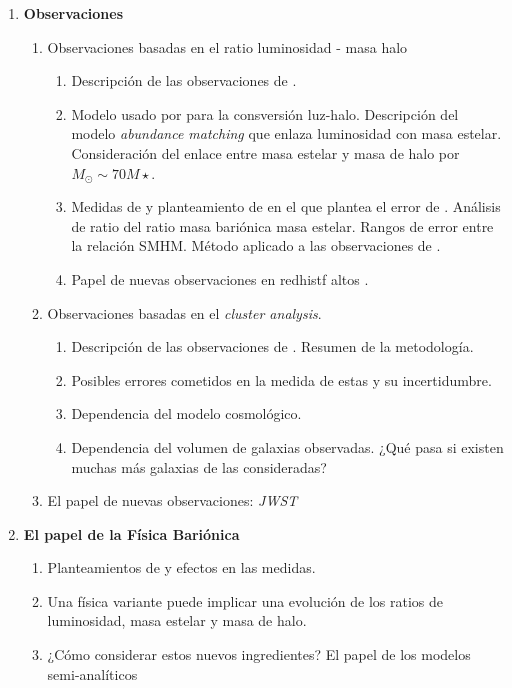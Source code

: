 \begin{enumerate}
	\item \textbf{Observaciones}
	\begin{enumerate}[{3.}1]
		\item Observaciones basadas en el ratio luminosidad - masa halo
		\begin{enumerate}[{3.1.}1]
			\item Descripción de las observaciones de \cite{bouwens2015uv}.
			\item Modelo usado por \cite{steinhardt2016impossibly} para la consversión luz-halo. Descripción del modelo \textit{abundance matching} que enlaza luminosidad con masa estelar. Consideración del enlace entre masa estelar y masa de halo por $M_\odot\sim 70 M\star$.
			\item Medidas de \citep{behroozi2019universemachine} y planteamiento de \cite{behroozi2018mostmassive} en el que plantea el error de \cite{steinhardt2016impossibly}. Análisis de ratio del ratio masa bariónica masa estelar. Rangos de error entre la relación SMHM. Método aplicado a las observaciones de \cite{bouwens2015uv}.
			\item Papel de nuevas observaciones en redhistf altos \citep{wang2019dominant}.
		\end{enumerate}
		\item Observaciones basadas en el \textit{cluster analysis}.
		\begin{enumerate}[{3.2.}1]
			\item Descripción de las observaciones de \cite{hildebrandt2009cars}. Resumen de la metodología.
			\item Posibles errores cometidos en la medida de estas y su incertidumbre.
			\item Dependencia del modelo cosmológico.
			\item Dependencia del volumen de galaxias observadas. ¿Qué pasa si existen muchas más galaxias de las consideradas?
		\end{enumerate}
		\item El papel de nuevas observaciones: \textit{JWST}
	\end{enumerate}
	
	\item \textbf{El papel de la Física Bariónica}
	\begin{enumerate}[{4.}1]
		\item Planteamientos de \cite{steinhardt2016impossibly} y efectos en las medidas.
		\item Una física variante puede implicar una evolución de los ratios de luminosidad, masa estelar y masa de halo.
		\item ¿Cómo considerar estos nuevos ingredientes? El papel de los modelos semi-analíticos
	\end{enumerate}
	

\end{enumerate}
